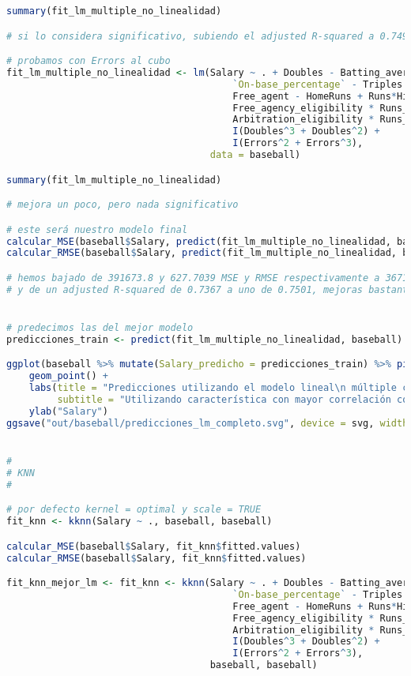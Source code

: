 \begin{lstlisting}[language=R]
summary(fit_lm_multiple_no_linealidad)

# si lo considera significativo, subiendo el adjusted R-squared a 0.7499

# probamos con Errors al cubo
fit_lm_multiple_no_linealidad <- lm(Salary ~ . + Doubles - Batting_average - Walks -
										`On-base_percentage` - Triples - Arbitration + Errors -
										Free_agent - HomeRuns + Runs*Hits +
										Free_agency_eligibility * Runs_batted_in +
										Arbitration_eligibility * Runs_batted_in +
										I(Doubles^3 + Doubles^2) +
										I(Errors^2 + Errors^3),
									data = baseball)

summary(fit_lm_multiple_no_linealidad)

# mejora un poco, pero nada significativo

# este será nuestro modelo final
calcular_MSE(baseball$Salary, predict(fit_lm_multiple_no_linealidad, baseball))
calcular_RMSE(baseball$Salary, predict(fit_lm_multiple_no_linealidad, baseball))

# hemos bajado de 391673.8 y 627.7039 MSE y RMSE respectivamente a 367189.1 y 607.7675,
# y de un adjusted R-squared de 0.7367 a uno de 0.7501, mejoras bastante significativas


# predecimos las del mejor modelo
predicciones_train <- predict(fit_lm_multiple_no_linealidad, baseball)

ggplot(baseball %>% mutate(Salary_predicho = predicciones_train) %>% pivot_longer(Salary:Salary_predicho), aes(x = Runs_batted_in, y = value, color = name)) +
	geom_point() +
	labs(title = "Predicciones utilizando el modelo lineal\n múltiple con interacciones y no linealidad",
		 subtitle = "Utilizando característica con mayor correlación con el salario.") +
	ylab("Salary")
ggsave("out/baseball/predicciones_lm_completo.svg", device = svg, width = 1920, height = 1080, units = "px", dpi = 150)


#
# KNN
#

# por defecto kernel = optimal y scale = TRUE
fit_knn <- kknn(Salary ~ ., baseball, baseball)

calcular_MSE(baseball$Salary, fit_knn$fitted.values)
calcular_RMSE(baseball$Salary, fit_knn$fitted.values)

fit_knn_mejor_lm <- fit_knn <- kknn(Salary ~ . + Doubles - Batting_average - Walks -
										`On-base_percentage` - Triples - Arbitration + Errors -
										Free_agent - HomeRuns + Runs*Hits +
										Free_agency_eligibility * Runs_batted_in +
										Arbitration_eligibility * Runs_batted_in +
										I(Doubles^3 + Doubles^2) +
										I(Errors^2 + Errors^3),
									baseball, baseball)


\end{lstlisting}
